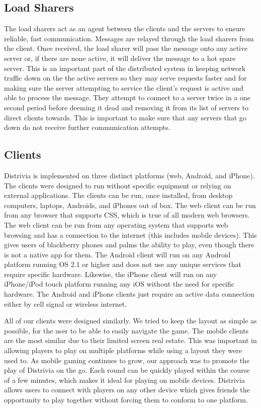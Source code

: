 \documentclass{dependencies/acm_proc_article-sp}
\begin{document}
\subsection{Load Sharers}
The load sharers act as an agent between the clients and the servers to ensure reliable, fast communication.
Messages are relayed through the load sharers from the client.
Once received, the load sharer will pass the message onto any active server or, if there are none active, it will deliver the message to a hot spare server.
This is an important part of the distributed system in keeping network traffic down on the the active servers so they may serve requests faster and for making sure the server attempting to service the client's request is active and able to process the message.
They attempt to connect to a server twice in a one second period before deeming it dead and removing it from its list of servers to direct clients towards.
This is important to make sure that any servers that go down do not receive further communication attempts.


\subsection{Clients}
Distrivia is implemented on three distinct platforms (web, Android, and iPhone).
The clients were designed to run without specific equipment or relying on external applications. 
The clients can be run, once installed, from desktop computers, laptops, Androids, and iPhones out of box.
The web client can be run from any browser that supports CSS, which is true of all modern web browsers.
The web client can be run from any operating system that supports web browsing and has a connection to the internet (this includes mobile devices). 
This gives users of blackberry phones and palms the ability to play, even though there is not a native app for them.
The Android client will run on any Android platform running OS 2.1 or higher and does not use any unique services that require specific hardware.
Likewise, the iPhone client will run on any iPhone/iPod touch platform running any iOS without the need for specific hardware.
The Android and iPhone clients just require an active data connection either by cell signal or wireless internet.

All of our clients were designed similarly.
We tried to keep the layout as simple as possible, for the user to be able to easily navigate the game.
The mobile clients are the most similar due to their limited screen real estate.
This was important in allowing players to play on multiple platforms while using a layout they were used to.
As mobile gaming continues to grow, our approach was to promote the play of Distrivia on the go. 
Each round can be quickly played within the course of a few minutes, which makes it ideal for playing on mobile devices.
Distrivia allows users to connect with players on any other device which gives friends the opportunity to play together without forcing them to conform to one platform.
\end{document}
